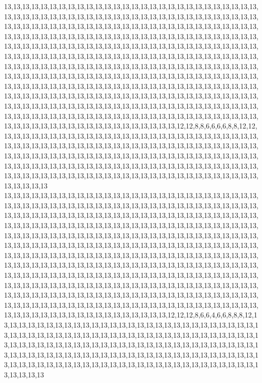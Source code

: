 13,13,13,13,13,13,13,13,13,13,13,13,13,13,13,13,13,13,13,13,13,13,13,13,13,13,13,13,13,13,13,13,13,13,13,13,13,13,13,13,13,13,13,13,13,13,13,13,13,13,13,13,13,13,13,13,13,13,13,13,13,13,13,13,13,13,13,13,13,13,13,13,13,13,13,13,13,13,13,13,13,13,13,13,13,13,13,13,13,13,13,13,13,13,13,13,13,13,13,13,13,13,13,13,13,13,13,13,13,13,13,13,13,13,13,13,13,13,13,13,13,13,13,13,13,13,13,13,13,13,13,13,13,13,13,13,13,13,13,13,13,13,13,13,13,13,13,13,13,13,13,13,13,13,13,13,13,13,13,13,13,13,13,13,13,13,13,13,13,13,13,13,13,13,13,13,13,13,13,13,13,13,13,13,13,13,13,13,13,13,13,13,13,13,13,13,13,13,13,13,13,13,13,13,13,13,13,13,13,13,13,13,13,13,13,13,13,13,13,13,13,13,13,13,13,13,13,13,13,13,13,13,13,13,13,13,13,13,13,13,13,13,13,13,13,13,13,13,13,13,13,13,13,13,13,13,13,13,13,13,13,13,13,13,13,13,13,13,13,13,13,13,13,13,13,13,13,13,13,13,13,13,13,13,13,13,13,13,13,13,13,13,13,13,13,13,13,13,13,13,13,13,13,13,13,13,13,13,13,13,13,13,13,13,13,13,13,13,13,13,13,13,13,13,13,13,13,13,13,13,13,13,13,13,13,13,13,13,13,13,13,13,13,13,13,13,13,13,13,13,13,13,13,13,13,12,12,8,8,6,6,6,6,8,8,12,12,13,13,13,13,13,13,13,13,13,13,13,13,13,13,13,13,13,13,13,13,13,13,13,13,13,13,13,13,13,13,13,13,13,13,13,13,13,13,13,13,13,13,13,13,13,13,13,13,13,13,13,13,13,13,13,13,13,13,13,13,13,13,13,13,13,13,13,13,13,13,13,13,13,13,13,13,13,13,13,13,13,13,13,13,13,13,13,13,13,13,13,13,13,13,13,13,13,13,13,13,13,13,13,13,13,13,13,13,13,13,13,13,13,13,13,13,13,13,13,13,13,13,13,13,13,13,13,13,13,13,13,13,13,13,13,13,13,13,13,13,13,13,13,13,13
13,13,13,13,13,13,13,13,13,13,13,13,13,13,13,13,13,13,13,13,13,13,13,13,13,13,13,13,13,13,13,13,13,13,13,13,13,13,13,13,13,13,13,13,13,13,13,13,13,13,13,13,13,13,13,13,13,13,13,13,13,13,13,13,13,13,13,13,13,13,13,13,13,13,13,13,13,13,13,13,13,13,13,13,13,13,13,13,13,13,13,13,13,13,13,13,13,13,13,13,13,13,13,13,13,13,13,13,13,13,13,13,13,13,13,13,13,13,13,13,13,13,13,13,13,13,13,13,13,13,13,13,13,13,13,13,13,13,13,13,13,13,13,13,13,13,13,13,13,13,13,13,13,13,13,13,13,13,13,13,13,13,13,13,13,13,13,13,13,13,13,13,13,13,13,13,13,13,13,13,13,13,13,13,13,13,13,13,13,13,13,13,13,13,13,13,13,13,13,13,13,13,13,13,13,13,13,13,13,13,13,13,13,13,13,13,13,13,13,13,13,13,13,13,13,13,13,13,13,13,13,13,13,13,13,13,13,13,13,13,13,13,13,13,13,13,13,13,13,13,13,13,13,13,13,13,13,13,13,13,13,13,13,13,13,13,13,13,13,13,13,13,13,13,13,13,13,13,13,13,13,13,13,13,13,13,13,13,13,13,13,13,13,13,13,13,13,13,13,13,13,13,13,13,13,13,13,13,13,13,13,13,13,13,13,13,13,13,13,13,13,13,13,13,13,13,13,13,13,13,13,13,13,13,13,13,13,13,13,13,13,13,13,13,13,13,13,13,13,13,13,13,13,13,12,12,12,8,6,6,4,6,6,8,8,8,12,13,13,13,13,13,13,13,13,13,13,13,13,13,13,13,13,13,13,13,13,13,13,13,13,13,13,13,13,13,13,13,13,13,13,13,13,13,13,13,13,13,13,13,13,13,13,13,13,13,13,13,13,13,13,13,13,13,13,13,13,13,13,13,13,13,13,13,13,13,13,13,13,13,13,13,13,13,13,13,13,13,13,13,13,13,13,13,13,13,13,13,13,13,13,13,13,13,13,13,13,13,13,13,13,13,13,13,13,13,13,13,13,13,13,13,13,13,13,13,13,13,13,13,13,13,13,13,13,13,13,13,13,13,13,13,13,13,13,13,13,13,13,13,13,13

